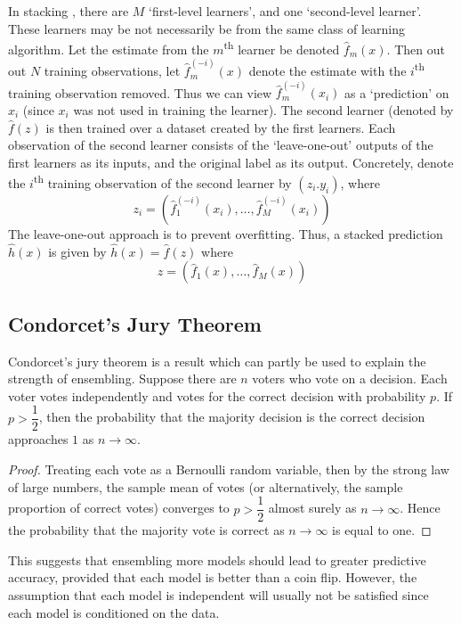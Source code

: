 \documentclass[11pt]{report} %
\begin{document}
In stacking \cite{Hastie2009, Zhou2012}, there are $M$ `first-level learners', and one `second-level learner'. These learners may be not necessarily be from the same class of learning algorithm. Let the estimate from the $m$\textsuperscript{th} learner be denoted $\hat{f}_{m}\left(x\right)$. Then out out $N$ training observations, let $\hat{f}_{m}^{\left(-i\right)}\left(x\right)$ denote the estimate with the $i$\textsuperscript{th} training observation removed. Thus we can view $\hat{f}_{m}^{\left(-i\right)}\left(x_{i}\right)$ as a `prediction' on $x_{i}$ (since $x_{i}$ was not used in training the learner). The second learner (denoted by $\hat{f}\left(z\right)$ is then trained over a dataset created by the first learners. Each observation of the second learner consists of the `leave-one-out' outputs of the first learners as its inputs, and the original label as its output. Concretely, denote the $i$\textsuperscript{th} training observation of the second learner by $\left(z_{i}. y_{i}\right)$, where
\begin{equation}
z_{i} = \left(\hat{f}_{1}^{\left(-i\right)}\left(x_{i}\right), \dots, \hat{f}_{M}^{\left(-i\right)}\left(x_{i}\right)\right)
\end{equation}
The leave-one-out approach is to prevent overfitting. Thus, a stacked prediction $\hat{h}\left(x\right)$ is given by $\hat{h}\left(x\right) = \hat{f}\left(z\right)$ where
\begin{equation}
z = \left(\hat{f}_{1}\left(x\right), \dots, \hat{f}_{M}\left(x\right)\right)
\end{equation}

\subsection{Condorcet's Jury Theorem}

Condorcet's jury theorem is a result which can partly be used to explain the strength of ensembling. Suppose there are $n$ voters who vote on a decision. Each voter votes independently and votes for the correct decision with probability $p$. If $p > \dfrac{1}{2}$, then the probability that the majority decision is the correct decision approaches $1$ as $n \to \infty$.
\begin{proof}
Treating each vote as a Bernoulli random variable, then by the strong law of large numbers, the sample mean of votes (or alternatively, the sample proportion of correct votes) converges to $p > \dfrac{1}{2}$ almost surely as $n \to \infty$. Hence the probability that the majority vote is correct as $n \to \infty$ is equal to one.
\end{proof}
This suggests that ensembling more models should lead to greater predictive accuracy, provided that each model is better than a coin flip. However, the assumption that each model is independent will usually not be satisfied since each model is conditioned on the data.
\end{document}

